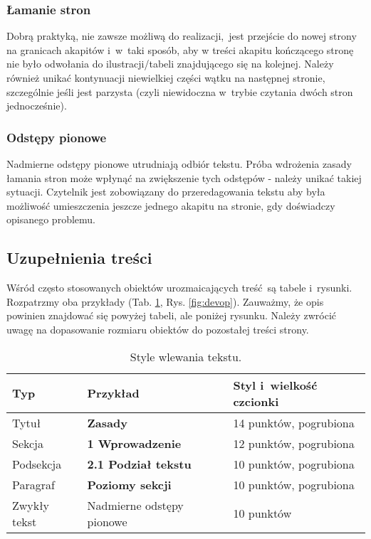 \subsubsection{Łamanie stron}
\label{subsubsec:pagebreak}

Dobrą praktyką, nie zawsze możliwą do realizacji, jest przejście do nowej strony na granicach akapitów i~w~taki sposób, aby w treści akapitu kończącego stronę nie było odwołania do ilustracji/tabeli znajdującego się na kolejnej. Należy również unikać kontynuacji niewielkiej części wątku na następnej stronie, szczególnie jeśli jest parzysta (czyli niewidoczna w~trybie czytania dwóch stron jednocześnie).

\subsubsection{Odstępy pionowe}
\label{subsubsec:verticalSpace}

Nadmierne odstępy pionowe utrudniają odbiór tekstu. Próba wdrożenia zasady łamania stron może wpłynąć na zwiększenie tych odstępów - należy unikać takiej sytuacji. Czytelnik jest zobowiązany do przeredagowania tekstu aby była możliwość umieszczenia jeszcze jednego akapitu na stronie, gdy doświadczy opisanego problemu.

\subsection{Uzupełnienia treści}
\label{subsec:additions}

Wśród często stosowanych obiektów urozmaicających treść są tabele i~rysunki. Rozpatrzmy oba przykłady (Tab. \ref{tab:styles}, Rys. \ref{fig:devop}). Zauważmy, że opis powinien znajdować się powyżej tabeli, ale poniżej rysunku. Należy zwrócić uwagę na dopasowanie rozmiaru obiektów do pozostałej treści strony.

\begin{table}
	\vspace{-4mm}
	\caption{
		Style wlewania tekstu.
	}
	\begin{center}
		\begin{tabular}{lll}
			\hline
			Typ & Przykład & Styl i~wielkość czcionki\\
			\hline
			Tytuł & {\Large\bfseries Zasady} & 14 punktów, pogrubiona\\
			Sekcja &  {\large\bfseries 1 Wprowadzenie} & 12 punktów, pogrubiona\\
			Podsekcja & {\bfseries 2.1 Podział tekstu} & 10 punktów, pogrubiona\\
			Paragraf & {\bfseries Poziomy sekcji} & 10 punktów, pogrubiona\\
			Zwykły tekst & Nadmierne odstępy pionowe & 10 punktów\\
			\hline
		\end{tabular}
	\end{center}
	\label{tab:styles}
	\vspace{-6mm}
\end{table}

